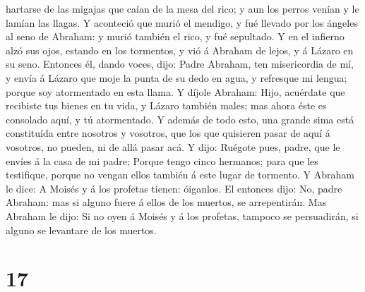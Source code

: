 hartarse de las migajas que caían de la mesa del rico; y aun los perros
venían y le lamían las llagas.  Y aconteció que murió el
mendigo, y fué llevado por los ángeles al seno de Abraham: y murió
también el rico, y fué sepultado.  Y en el infierno alzó
sus ojos, estando en los tormentos, y vió á Abraham de lejos, y á Lázaro
en su seno.  Entonces él, dando voces, dijo: Padre Abraham,
ten misericordia de mí, y envía á Lázaro que moje la punta de su dedo en
agua, y refresque mi lengua; porque soy atormentado en esta llama.
 Y díjole Abraham: Hijo, acuérdate que recibiste tus bienes
en tu vida, y Lázaro también males; mas ahora éste es consolado aquí, y
tú atormentado.  Y además de todo esto, una grande sima
está constituída entre nosotros y vosotros, que los que quisieren pasar
de aquí á vosotros, no pueden, ni de allá pasar acá.  Y
dijo: Ruégote pues, padre, que le envíes á la casa de mi padre;
 Porque tengo cinco hermanos; para que les testifique,
porque no vengan ellos también á este lugar de tormento.  Y
Abraham le dice: A Moisés y á los profetas tienen: óiganlos.
 El entonces dijo: No, padre Abraham: mas si alguno fuere á
ellos de los muertos, se arrepentirán.  Mas Abraham le
dijo: Si no oyen á Moisés y á los profetas, tampoco se persuadirán, si
alguno se levantare de los muertos.

\hypertarget{section-16}{%
\section{17}\label{section-16}}

